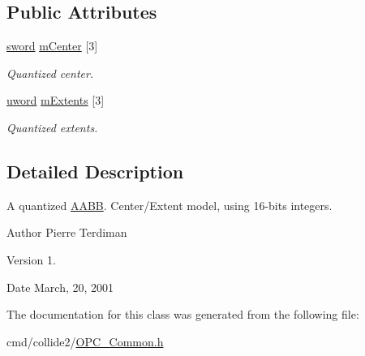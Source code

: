 \subsection*{Public Attributes}
\begin{DoxyCompactItemize}
\item 
\hyperlink{IceTypes_8h_a4f39f3859910e22cf5f7ab0307882e3f}{sword} \hyperlink{classQuantizedAABB_a66740f7547d4ebd8bdfe9543da56787e}{m\+Center} \mbox{[}3\mbox{]}\hypertarget{classQuantizedAABB_a66740f7547d4ebd8bdfe9543da56787e}{}\label{classQuantizedAABB_a66740f7547d4ebd8bdfe9543da56787e}

\begin{DoxyCompactList}\small\item\em Quantized center. \end{DoxyCompactList}\item 
\hyperlink{IceTypes_8h_a42fa576a6a3b73c1efc32ab91d176300}{uword} \hyperlink{classQuantizedAABB_a3eea12a3576e9824a68049904be04df6}{m\+Extents} \mbox{[}3\mbox{]}\hypertarget{classQuantizedAABB_a3eea12a3576e9824a68049904be04df6}{}\label{classQuantizedAABB_a3eea12a3576e9824a68049904be04df6}

\begin{DoxyCompactList}\small\item\em Quantized extents. \end{DoxyCompactList}\end{DoxyCompactItemize}


\subsection{Detailed Description}
A quantized \hyperlink{classAABB}{A\+A\+BB}. Center/\+Extent model, using 16-\/bits integers.

\begin{DoxyAuthor}{Author}
Pierre Terdiman 
\end{DoxyAuthor}
\begin{DoxyVersion}{Version}
1. 
\end{DoxyVersion}
\begin{DoxyDate}{Date}
March, 20, 2001 
\end{DoxyDate}


The documentation for this class was generated from the following file\+:\begin{DoxyCompactItemize}
\item 
cmd/collide2/\hyperlink{OPC__Common_8h}{O\+P\+C\+\_\+\+Common.\+h}\end{DoxyCompactItemize}
